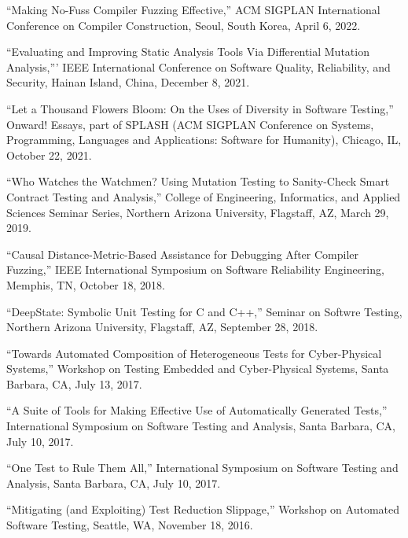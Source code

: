 \documentclass[ComputerScience]{vita}
\begin{document}
\begin{vita}
\begin{Selected Presentations}
  
\item ``Making No-Fuss Compiler Fuzzing Effective,'' ACM SIGPLAN
  International Conference on Compiler Construction, Seoul, South
  Korea, April 6, 2022.

\item ``Evaluating and Improving Static Analysis Tools Via
  Differential Mutation Analysis,''' IEEE International Conference on Software
Quality, Reliability, and Security, Hainan Island, China, December 8, 2021.
  
\item ``Let a Thousand Flowers Bloom: On the Uses of Diversity in Software Testing,'' Onward! Essays, part of SPLASH (ACM SIGPLAN Conference on Systems, Programming, Languages and Applications: Software for Humanity), Chicago, IL, October 22, 2021.

\item ``Who Watches the Watchmen? Using Mutation Testing to 
  Sanity-Check Smart Contract Testing and Analysis,'' College of 
  Engineering, Informatics, and Applied Sciences Seminar Series, 
  Northern Arizona University, Flagstaff, AZ, March 29, 2019. 

\item ``Causal Distance-Metric-Based Assistance for Debugging After
  Compiler Fuzzing,'' IEEE International Symposium on Software
  Reliability Engineering, Memphis, TN, October 18, 2018.
  
\item ``DeepState: Symbolic Unit Testing for C and C++,'' Seminar on
  Softwre Testing, Northern Arizona University, Flagstaff, AZ,
  September 28, 2018.
  
\item ``Towards Automated Composition of Heterogeneous Tests for Cyber-Physical Systems,'' Workshop on Testing Embedded and Cyber-Physical Systems, Santa Barbara, CA, July 13, 2017.

\item ``A Suite of Tools for Making Effective Use of Automatically Generated Tests,'' International Symposium on Software Testing and Analysis, Santa Barbara, CA, July 10, 2017.

\item ``One Test to Rule Them All,'' International Symposium on Software Testing and Analysis, Santa Barbara, CA, July 10, 2017.

\item ``Mitigating (and Exploiting) Test Reduction Slippage,'' Workshop on Automated Software Testing, Seattle, WA, November 18, 2016.


\end{Selected Presentations}
\end{vita}
\end{document}
